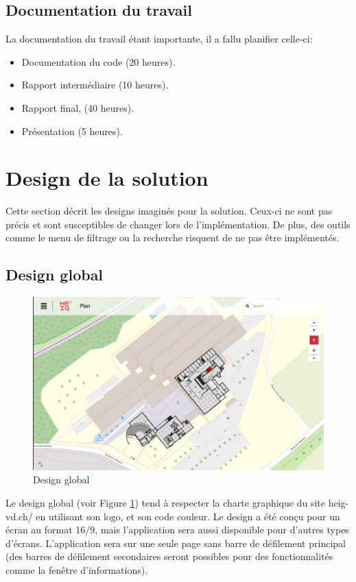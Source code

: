 \documentclass[
    iai, %
    il, %
]{heig-tb}
\begin{document}
\subsection{Documentation du travail}
La documentation du travail étant importante, il a fallu planifier celle-ci:

\begin{itemize}
    \item Documentation du code (20 heures).
    \item Rapport intermédiaire (10 heures).
    \item Rapport final, (40 heures).
    \item Présentation (5 heures).
\end{itemize}

\section{Design de la solution}

Cette section décrit les designs imaginés pour la solution.
Ceux-ci ne sont pas précis et sont susceptibles de changer lors de l'implémentation.
De plus, des outils comme le menu de filtrage ou la recherche risquent de ne pas être implémentés.

\subsection{Design global}

\begin{figure}[h]
    \centering
    \includegraphics[scale=0.4]{designGlobal.png}
    \caption{Design global}
    \label{fig:globalDesign}
\end{figure}

Le design global (voir Figure \ref{fig:globalDesign}) tend à respecter la charte graphique du site heig-vd.ch/ en utilisant son logo, et son code couleur.
Le design a été conçu pour un écran au format 16/9, mais l'application sera aussi disponible pour d'autres types d'écrans.
L'application sera sur une seule page sans barre de défilement principal
(des barres de défilement secondaires seront possibles pour des fonctionnalités comme la fenêtre d'informations).
\end{document}
